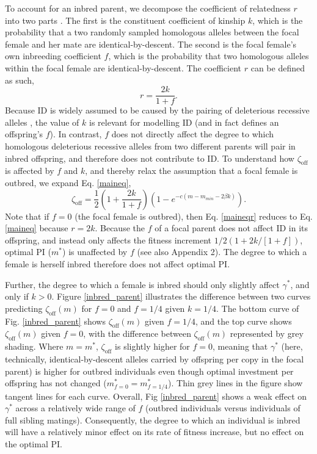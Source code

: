 \documentclass[12pt]{article}
\begin{document}
To account for an inbred parent, we decompose the coefficient of relatedness $r$ into two parts \cite[see][]{Hamilton1972, Michod1979}. The first is the constituent coefficient of kinship $k$, which is the probability that a two randomly sampled homologous alleles between the focal female and her mate are identical-by-descent. The second is the focal female's own inbreeding coefficient $f$, which is the probability that two homologous alleles within the focal female are identical-by-descent. The coefficient $r$ can be defined as such,
\begin{equation} \label{rdef}
r = \frac{2k}{1 + f}.
\end{equation}
Because ID is widely assumed to be caused by the pairing of deleterious recessive alleles \cite[][]{Charlesworth2009}, the value of $k$ is relevant for modelling ID (and in fact defines an offspring's $f$). In contrast, $f$ does not directly affect the degree to which homologous deleterious recessive alleles from two different parents will pair in inbred offspring, and therefore does not contribute to ID. To understand how $\zeta_{\textrm{off}}$ is affected by $f$ and $k$, and thereby relax the assumption that a focal female is outbred, we expand Eq. \ref{maineq},
\begin{equation} \label{maineqr}
\zeta_{\textrm{off}} = \frac{1}{2}\left(1+\frac{2k}{1+f}\right)\left(1-e^{-c\left(m-m_{min}-2\beta k\right)}\right).
\end{equation}
Note that if $f=0$ (the focal female is outbred), then Eq. \ref{maineqr} reduces to Eq. \ref{maineq} because $r=2k$. Because the $f$ of a focal parent does not affect ID in its offspring, and instead only affects the fitness increment $1/2\left(1+ 2 k / \left[1 + f\right]\right)$, optimal PI ($m^{*}$) is unaffected by $f$  (see also Appendix 2). The degree to which a female is herself inbred therefore does not affect optimal PI. %

Further, the degree to which a female is inbred should only slightly affect $\gamma^{*}$, and only if $k>0$. Figure \ref{inbred_parent} illustrates the difference between two curves predicting $\zeta_{\textrm{off}}(m)$ for $f=0$ and $f=1/4$ given $k=1/4$. The bottom curve of Fig. \ref{inbred_parent} shows $\zeta_{\textrm{off}}(m)$ given $f=1/4$, and the top curve shows $\zeta_{\textrm{off}}(m)$ given $f=0$, with the difference between $\zeta_{\textrm{off}}(m)$ represented by grey shading. Where $m=m^{*}$, $\zeta_{\textrm{off}}$ is slightly higher for $f=0$, meaning that $\gamma^{*}$ (here, technically, identical-by-descent alleles carried by offspring per copy in the focal parent) is higher for outbred individuals even though optimal investment per offspring has not changed ($m^{*}_{f=0}=m^{*}_{f=1/4}$). Thin grey lines in the figure show tangent lines for each curve. Overall, Fig \ref{inbred_parent} shows a weak effect on $\gamma^{*}$ across a relatively wide range of $f$ (outbred individuals versus individuals of full sibling matings). Consequently, the degree to which an individual is inbred will have a relatively minor effect on its rate of fitness increase, but no effect on the optimal PI.
\end{document}
